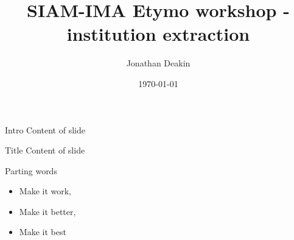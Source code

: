 \documentclass{beamer}
\begin{document}
\title{SIAM-IMA Etymo workshop - institution extraction}
\author{Jonathan Deakin}
\date{\today}

\begin{frame}
  \maketitle
\end{frame}

\begin{frame}{Intro}
  Content of slide
\end{frame}

\begin{frame}{Title}
  Content of slide
\end{frame}

\begin{frame}{Parting words}
  \begin{itemize}
    \item<1->[] Make it work,
    \item<2->[] Make it better,
    \item<3->[] Make it best
  \end{itemize}
\end{frame}
\end{document}
